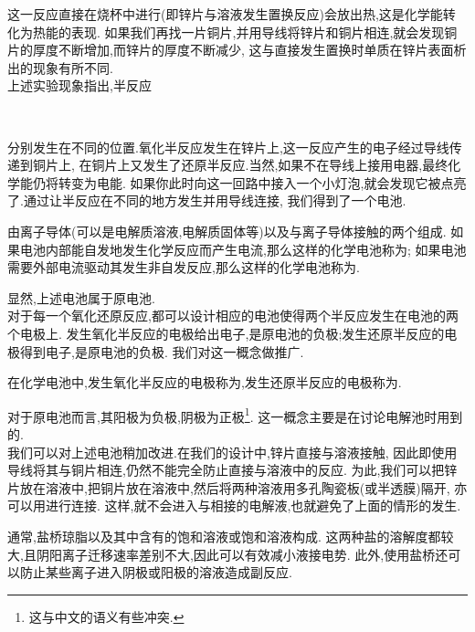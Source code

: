 \documentclass{ctexart}
\begin{document}
这一反应直接在烧杯中进行(即锌片与溶液发生置换反应)会放出热,这是化学能转化为热能的表现.%
如果我们再找一片铜片,并用导线将锌片和铜片相连,就会发现铜片的厚度不断增加,而锌片的厚度不断减少,%
这与直接发生置换时单质在锌片表面析出的现象有所不同.\\
\indent 上述实验现象指出,半反应
\begin{tightcenter}
    \\
\end{tightcenter}
分别发生在不同的位置.氧化半反应发生在锌片上,这一反应产生的电子经过导线传递到铜片上,%
在铜片上又发生了还原半反应.当然,如果不在导线上接用电器,最终化学能仍将转变为电能.%
如果你此时向这一回路中接入一个小灯泡,就会发现它被点亮了.通过让半反应在不同的地方发生并用导线连接,%
我们得到了一个电池.
\begin{definition}[6A.2.1 化学电池]
    由离子导体(可以是电解质溶液,电解质固体等)以及与离子导体接触的两个组成.%
    如果电池内部能自发地发生化学反应而产生电流,那么这样的化学电池称为;%
    如果电池需要外部电流驱动其发生非自发反应,那么这样的化学电池称为.
\end{definition}
显然,上述电池属于原电池.\\
\indent 对于每一个氧化还原反应,都可以设计相应的电池使得两个半反应发生在电池的两个电极上.%
发生氧化半反应的电极给出电子,是原电池的负极;发生还原半反应的电极得到电子,是原电池的负极.%
我们对这一概念做推广.
\begin{definition}[6A.2.2 阳极与阴极]
    在化学电池中,发生氧化半反应的电极称为,发生还原半反应的电极称为.
\end{definition}
对于原电池而言,其阳极为负极,阴极为正极\footnote{这与中文的语义有些冲突.}.%
这一概念主要是在讨论电解池时用到的.\\
\indent 我们可以对上述电池稍加改进.在我们的设计中,锌片直接与溶液接触,%
因此即使用导线将其与铜片相连,仍然不能完全防止直接与溶液中的反应.%
为此,我们可以把锌片放在溶液中,把铜片放在溶液中,然后将两种溶液用多孔陶瓷板(或半透膜)隔开,%
亦可以用进行连接.%
这样,就不会进入与相接的电解液,也就避免了上面的情形的发生.
\begin{hint}
    通常,盐桥琼脂以及其中含有的饱和溶液或饱和溶液构成.%
    这两种盐的溶解度都较大,且阴阳离子迁移速率差别不大,因此可以有效减小液接电势\footnotemark.%
    此外,使用盐桥还可以防止某些离子进入阴极或阳极的溶液造成副反应.
\end{hint}
\end{document}
